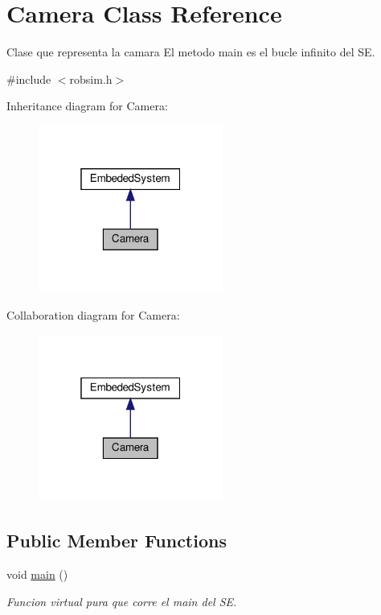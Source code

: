 \hypertarget{classCamera}{}\section{Camera Class Reference}
\label{classCamera}


Clase que representa la camara El metodo main es el bucle infinito del SE.  




{\ttfamily \#include $<$robsim.\+h$>$}



Inheritance diagram for Camera\+:\nopagebreak
\begin{figure}[H]
\begin{center}
\leavevmode
\includegraphics[width=172pt]{classCamera__inherit__graph}
\end{center}
\end{figure}


Collaboration diagram for Camera\+:\nopagebreak
\begin{figure}[H]
\begin{center}
\leavevmode
\includegraphics[width=172pt]{classCamera__coll__graph}
\end{center}
\end{figure}
\subsection*{Public Member Functions}
\begin{DoxyCompactItemize}
\item 
void \hyperlink{classCamera_a1719371e1e57ad18abfa5dd3d971bb39}{main} ()
\begin{DoxyCompactList}\small\item\em Funcion virtual pura que corre el main del SE. \end{DoxyCompactList}\end{DoxyCompactItemize}


